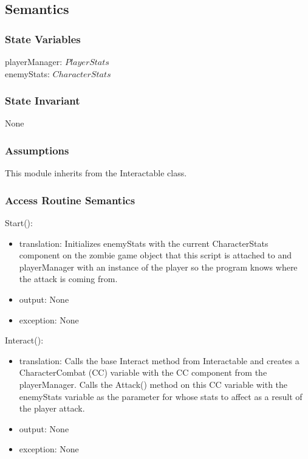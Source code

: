 \documentclass[12pt]{article}
\begin{document}
\subsection* {Semantics}

\subsubsection* {State Variables}

playerManager: $PlayerStats$\\
enemyStats: $CharacterStats$\\

\subsubsection* {State Invariant}

None

\subsubsection* {Assumptions}

This module inherits from the Interactable class.

\subsubsection* {Access Routine Semantics}

\noindent Start():
\begin{itemize}
\item translation: Initializes enemyStats with the current CharacterStats component on the zombie game object that this script is attached to and playerManager with an instance of the player so the program knows where the attack is coming from.
\item output: None
\item exception: None
\end{itemize}

\noindent Interact():
\begin{itemize}
\item translation: Calls the base Interact method from Interactable and creates a CharacterCombat (CC) variable with the CC component from the playerManager. Calls the Attack() method on this CC variable with the enemyStats variable as the parameter for whose stats to affect as a result of the player attack.
\item output: None
\item exception: None
\end{itemize}
\end{document}
